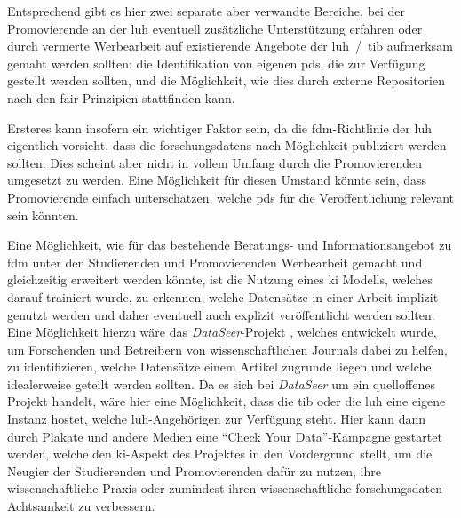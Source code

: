 Entsprechend gibt es hier zwei separate aber verwandte Bereiche, bei der Promovierende an der \gls{luh} eventuell zusätzliche Unterstützung erfahren oder durch vermerte Werbearbeit auf existierende Angebote der \gls{luh}~/~\gls{tib} aufmerksam gemaht werden sollten:
die Identifikation von eigenen \glspl{pd}, die zur Verfügung gestellt werden sollten, und die Möglichkeit, wie dies durch externe Repositorien nach den \gls{fair}-Prinzipien stattfinden kann.

Ersteres kann insofern ein wichtiger Faktor sein, da die \gls{fdm}-Richtlinie der \gls{luh} eigentlich vorsieht, dass die \glspl{forschungsdaten} nach Möglichkeit publiziert werden sollten.
Dies scheint aber nicht in vollem Umfang durch die Promovierenden umgesetzt zu werden.
Eine Möglichkeit für diesen Umstand könnte sein, dass Promovierende einfach unterschätzen, welche \glspl{pd} für die Veröffentlichung relevant sein könnten.

Eine Möglichkeit, wie für das bestehende Beratungs- und Informationsangebot zu \gls{fdm} unter den Studierenden und Promovierenden Werbearbeit gemacht und gleichzeitig erweitert werden könnte, ist die Nutzung eines \gls{ki} Modells, welches darauf trainiert wurde, zu erkennen, welche Datensätze in einer Arbeit implizit genutzt werden und daher eventuell auch explizit veröffentlicht werden sollten.
Eine Möglichkeit hierzu wäre das \textit{DataSeer}-Projekt \autocite{dataseer}, welches entwickelt wurde, um Forschenden und Betreibern von wissenschaftlichen Journals dabei zu helfen, zu identifizieren, welche Datensätze einem Artikel zugrunde liegen und welche idealerweise geteilt werden sollten.
Da es sich bei \textit{DataSeer} um ein quelloffenes Projekt handelt, wäre hier eine Möglichkeit, dass die \gls{tib} oder die \gls{luh} eine eigene Instanz hostet, welche \gls{luh}-Angehörigen zur Verfügung steht.
Hier kann dann durch Plakate und andere Medien eine \enquote{Check Your Data}-Kampagne gestartet werden, welche den \gls{ki}-Aspekt des Projektes in den Vordergrund stellt, um die Neugier der Studierenden und Promovierenden dafür zu nutzen, ihre wissenschaftliche Praxis oder zumindest ihren wissenschaftliche \gls{forschungsdaten}-Achtsamkeit zu verbessern.

